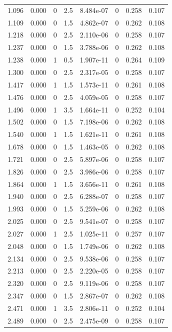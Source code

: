 \documentclass[preview]{standalone}
\begin{document}
{{\begin{tabular}{L{1.2cm}C{1.2cm} C{0.3cm}C{0.5cm} C{1.4cm}C{1.4cm} C{1.4cm}C{1.4cm}}
  1.096  &  0.000  & 0     & 2.5 &  8.484e-07  & 0  & 0.258 &  0.107   \\ 
  1.109  &  0.000  & 0     & 1.5 &  4.862e-07  & 0  & 0.262 &  0.108   \\ 
  1.218  &  0.000  & 0     & 2.5 &  2.110e-06  & 0  & 0.258 &  0.107   \\ 
  1.237  &  0.000  & 0     & 1.5 &  3.788e-06  & 0  & 0.262 &  0.108   \\ 
  1.238  &  0.000  & 1     & 0.5 &  1.907e-11  & 0  & 0.264 &  0.109   \\ 
  1.300  &  0.000  & 0     & 2.5 &  2.317e-05  & 0  & 0.258 &  0.107   \\ 
  1.417  &  0.000  & 1     & 1.5 &  1.573e-11  & 0  & 0.261 &  0.108   \\ 
  1.476  &  0.000  & 0     & 2.5 &  4.059e-05  & 0  & 0.258 &  0.107   \\ 
  1.496  &  0.000  & 1     & 3.5 &  1.664e-11  & 0  & 0.252 &  0.104   \\ 
  1.502  &  0.000  & 0     & 1.5 &  7.198e-06  & 0  & 0.262 &  0.108   \\ 
  1.540  &  0.000  & 1     & 1.5 &  1.621e-11  & 0  & 0.261 &  0.108   \\ 
  1.678  &  0.000  & 0     & 1.5 &  1.463e-05  & 0  & 0.262 &  0.108   \\ 
  1.721  &  0.000  & 0     & 2.5 &  5.897e-06  & 0  & 0.258 &  0.107   \\ 
  1.826  &  0.000  & 0     & 2.5 &  3.986e-06  & 0  & 0.258 &  0.107   \\ 
  1.864  &  0.000  & 1     & 1.5 &  3.656e-11  & 0  & 0.261 &  0.108   \\ 
  1.940  &  0.000  & 0     & 2.5 &  6.288e-07  & 0  & 0.258 &  0.107   \\ 
  1.993  &  0.000  & 0     & 1.5 &  5.259e-06  & 0  & 0.262 &  0.108   \\ 
  2.025  &  0.000  & 0     & 2.5 &  9.541e-07  & 0  & 0.258 &  0.107   \\ 
  2.027  &  0.000  & 1     & 2.5 &  1.025e-11  & 0  & 0.257 &  0.107   \\ 
  2.048  &  0.000  & 0     & 1.5 &  1.749e-06  & 0  & 0.262 &  0.108   \\ 
  2.134  &  0.000  & 0     & 2.5 &  9.538e-06  & 0  & 0.258 &  0.107   \\ 
  2.213  &  0.000  & 0     & 2.5 &  2.220e-05  & 0  & 0.258 &  0.107   \\ 
  2.320  &  0.000  & 0     & 2.5 &  9.119e-06  & 0  & 0.258 &  0.107   \\ 
  2.347  &  0.000  & 0     & 1.5 &  2.867e-07  & 0  & 0.262 &  0.108   \\ 
  2.471  &  0.000  & 1     & 3.5 &  2.806e-11  & 0  & 0.252 &  0.104   \\ 
  2.489  &  0.000  & 0     & 2.5 &  2.475e-09  & 0  & 0.258 &  0.107   \\ 
\hline 
\end{tabular} 

}}
\end{document}
